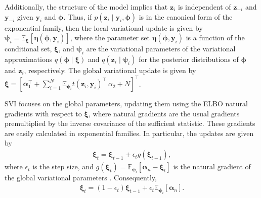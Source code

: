 Additionally, the structure of the model implies that $\boldsymbol{z}_i$ is independent of $\boldsymbol{z}_{-i}$ and $\boldsymbol{y}_{-i}$ given $\boldsymbol{y}_i$ and $\boldsymbol{\phi}$. Thus, if $p(\boldsymbol{z}_i \mid \boldsymbol{y}_i, \boldsymbol{\phi})$ is in the canonical form of the exponential family, then the local variational update is given by $\boldsymbol{\psi}_i = \mathbb{E}_{\boldsymbol{\xi}}[\boldsymbol{\eta}(\boldsymbol{\phi}, \boldsymbol{y}_i)]$, where the parameter set $\boldsymbol{\eta}(\boldsymbol{\phi}, \boldsymbol{y}_i)$ is a function of the conditional set, $\boldsymbol{\xi}$, and $\boldsymbol{\psi}_i$ are the variational parameters of the variational approximations $q(\boldsymbol{\phi} \mid \boldsymbol{\xi})$ and $q(\boldsymbol{z}_i \mid \boldsymbol{\psi}_i)$ for the posterior distributions of $\boldsymbol{\phi}$ and $\boldsymbol{z}_i$, respectively. The global variational update is given by $\boldsymbol{\xi} = [\boldsymbol{\alpha}_1^{\top} + \sum_{i=1}^N \mathbb{E}_{\boldsymbol{\psi}_i} t(\boldsymbol{z}_i, \boldsymbol{y}_i)^{\top} \ \alpha_2 + N]^{\top}$.

SVI focuses on the global parameters, updating them using the ELBO natural gradients with respect to $\boldsymbol{\xi}$, where natural gradients are the usual gradients premultiplied by the inverse covariance of the sufficient statistic. These gradients are easily calculated in exponential families. In particular, the updates are given by
\begin{align*}
	\boldsymbol{\xi}_t=\boldsymbol{\xi}_{t-1}+\epsilon_t g(\boldsymbol{\xi}_{t-1}),
\end{align*} 
where $\epsilon_t$ is the step size, and $g(\boldsymbol{\xi}_t)=\mathbb{E}_{\boldsymbol{\psi}_i}[\boldsymbol{\alpha}_n-\boldsymbol{\xi}_t]$ is the natural gradient of the global variational parameters  \cite{blei2017variational}. Consequently,
\begin{align*}
	\boldsymbol{\xi}_t=(1-\epsilon_t)\boldsymbol{\xi}_{t-1}+\epsilon_t \mathbb{E}_{\boldsymbol{\psi}_i}[\boldsymbol{\alpha}_n].
\end{align*}    

